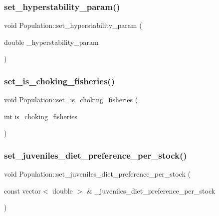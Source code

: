 \mbox{\label{class_population_a9406d88c38e04dc2a99b2958fda841d1}} 
\subsubsection{\texorpdfstring{set\_hyperstability\_param()}{set\_hyperstability\_param()}}
{\footnotesize\ttfamily void Population\+::set\+\_\+hyperstability\+\_\+param (\begin{DoxyParamCaption}\item[{double}]{\+\_\+hyperstability\+\_\+param }\end{DoxyParamCaption})}

\mbox{\label{class_population_a4b67e1bdf4faa2f7bd139ea7192a2223}} 
\subsubsection{\texorpdfstring{set\_is\_choking\_fisheries()}{set\_is\_choking\_fisheries()}}
{\footnotesize\ttfamily void Population\+::set\+\_\+is\+\_\+choking\+\_\+fisheries (\begin{DoxyParamCaption}\item[{int}]{is\+\_\+choking\+\_\+fisheries }\end{DoxyParamCaption})}

\mbox{\label{class_population_a66752f64f8fa4da941f22030b3196cb3}} 
\subsubsection{\texorpdfstring{set\_juveniles\_diet\_preference\_per\_stock()}{set\_juveniles\_diet\_preference\_per\_stock()}}
{\footnotesize\ttfamily void Population\+::set\+\_\+juveniles\+\_\+diet\+\_\+preference\+\_\+per\+\_\+stock (\begin{DoxyParamCaption}\item[{const vector$<$ double $>$ \&}]{\+\_\+juveniles\+\_\+diet\+\_\+preference\+\_\+per\+\_\+stock }\end{DoxyParamCaption})}

